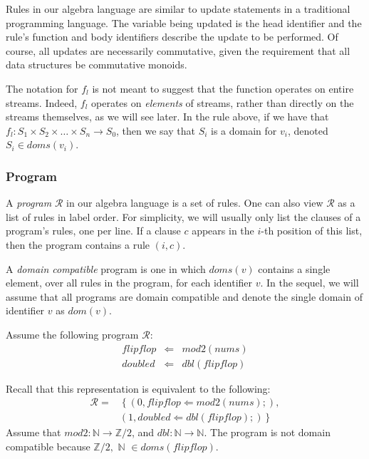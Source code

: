 Rules in our algebra language are similar to update statements in a traditional programming language.  The variable being updated is the head identifier and the rule's function and body identifiers describe the update to be performed.  Of course, all updates are necessarily commutative, given the requirement that all data structures be commutative monoids.

The notation for $f_l$ is not meant to suggest that the function operates on entire streams.  Indeed, $f_l$ operates on {\em elements} of streams, rather than directly on the streams themselves, as we will see later.  In the rule above, if we have that $f_l : S_1 \times S_2 \times \dots \times S_n \rightarrow S_0$, then we say that $S_i$ is a domain for $v_i$, denoted $S_i \in doms(v_i)$.

\subsubsection{Program}

A {\em program} $\mathcal{R}$ in our algebra language is a set of rules.  One can also view $\mathcal{R}$ as a list of rules in label order.  For simplicity, we will usually only list the clauses of a program's rules, one per line.  If a clause $c$ appears in the $i$-th position of this list, then the program contains a rule $(i,c)$.

A {\em domain compatible} program is one in which $doms(v)$ contains a single element, over all rules in the program, for each identifier $v$.  In the sequel, we will assume that all programs are domain compatible and denote the single domain of identifier $v$ as $dom(v)$.

\begin{example}
Assume the following program $\mathcal{R}$:
\begin{eqnarray*}
flipflop & \Leftarrow & mod2(nums) \\
doubled & \Leftarrow & dbl(flipflop)
\end{eqnarray*}

Recall that this representation is equivalent to the following:
\begin{equation*}
\begin{split}
\mathcal{R} = & \left\{(0, flipflop \Leftarrow mod2(nums);), \right. \\
& \left. (1, doubled \Leftarrow dbl(flipflop);) \right\}
\end{split}
\end{equation*}
Assume that $mod2 : \mathbb{N} \rightarrow \mathbb{Z}/2$, and $dbl : \mathbb{N} \rightarrow \mathbb{N}$.  The program is not domain compatible because $\mathbb{Z}/2, \,\, \mathbb{N} \,\, \in doms(flipflop)$.
\end{example}

